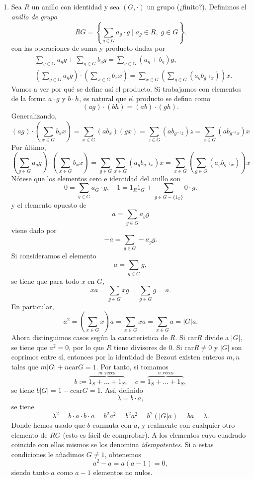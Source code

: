 \documentclass[11pt]{book}
\def\car{\mathrm{car}}
\theoremstyle{definition}
\begin{document}
\begin{enumerate}
    \item Sea $R$ un anillo con identidad y sea $(G,\cdot)$ un grupo (¿finito?). Definimos el \textit{anillo de grupo}\[
    RG=\left\{\sum_{g\in G}a_g\cdot g \;\Big|\; a_g\in R,\; g\in G\right\}.
    \]con las operaciones de suma y producto dadas por\[\begin{split}
        &\sum_{g\in G}a_g g+\sum_{g\in G}b_g g=\sum_{g\in G}(a_g+b_g)g,\\
        &\left(\sum_{g\in G}a_g g\right)\cdot \left(\sum_{x\in G}b_x x\right)=\sum_{x\in G}\left(\sum_{g\in G}(a_gb_{g^{-1}x})\right)x.
    \end{split}
    \]Vamos a ver por qué se define así el producto. Si trabajamos con elementos de la forma $a\cdot g$ y $b\cdot h$, es natural que el producto se defina como\[
    (a g)\cdot(b h) = (ab)\cdot (gh).
    \]Generalizando,\[
    (a g)\cdot \left(\sum_{x\in G}b_x x\right)=\sum_{x\in G}(ab_x)(gx)=\sum_{z\in G}(ab_{g^{-1}z})z=\sum_{z\in G}(ab_{g^{-1}x})x
    \]Por último,\[
        \left(\sum_{g\in G}a_g g\right)\cdot \left(\sum_{x\in G}b_x x\right)=\sum_{g\in G}\sum_{x\in G}(a_gb_{g^{-1}x})x=\sum_{x\in G}\left(\sum_{g\in G}(a_gb_{g^{-1}x})\right)x
    \]Nótese que los elementos cero e identidad del anillo son\[
    0=\sum_{g\in G}a_G\cdot g,\quad 1=1_R1_G+\sum_{g\in G-\{1_G\}}0\cdot g.
    \]y el elemento opuesto de\[
    a = \sum_{g\in G}a_g g
    \]viene dado por\[
    -a = \sum_{g\in G}-a_gg.
    \]Si consideramos el elemento\[
    a = \sum_{g\in G}g,
    \]se tiene que para todo $x$ en $G$,\[
    xa=\sum_{g\in G}xg = \sum_{g\in G}g=a.
    \]En particular, \[
    a^2=\left(\sum_{x\in G}x\right)a=\sum_{x\in G}xa = \sum_{x\in G} a = |G| a.
    \]Ahora distinguimos casos según la característica de $R$. Si $\car R$ divide a $|G|$, se tiene que $a^2=0$, por lo que $R$ tiene divisores de 0. Si $\car R\neq 0$ y $|G|$ son coprimos entre sí, entonces por la identidad de Bezout existen enteros $m,n$ tales que $m|G|+n\car G=1$. Por tanto, si tomamos\[
    b:=\overbrace{1_S+\dots+1_S}^{m\text{ veces}},\quad c=\overbrace{1_S+\dots+1_S}^{n\text{ veces}},
    \]se tiene $b|G|=1-c\car G=1$. Así, definido\[
    \lambda = b\cdot a,
    \]se tiene\[
    \lambda^2=b\cdot a\cdot b\cdot a=b^2a^2=b^2a^2=b^2(|G|a)=ba=\lambda.
    \]Donde hemos usado que $b$ conmuta con $a$, y realmente con cualquier otro elemento de $RG$ (esto es fácil de comprobar). A los elementos cuyo cuadrado coincide con ellos mismos se los denomina \textit{idempotentes}. Si a estas condiciones le añadimos $G\neq 1$, obtenemos\[
    a^2-a=a(a-1)=0,
    \]siendo tanto $a$ como $a-1$ elementos no nulos.


\end{enumerate}
\end{document}
